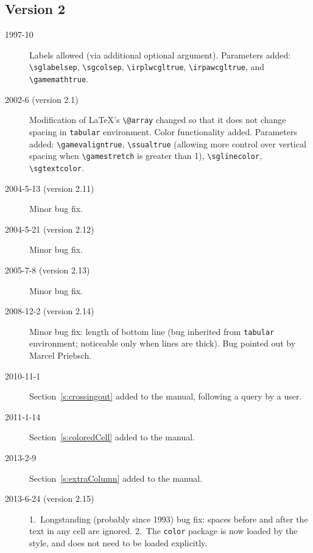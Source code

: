 \documentclass[12pt]{article}
\begin{document}
{\subsection*{Version 2}
\begin{description}
\item[1997-10] Labels allowed (via additional optional argument).  Parameters
added: \verb+\sglabelsep+, \verb+\sgcolsep+, \verb+\irplwcgltrue+,
\verb+\irpawcgltrue+, and \verb+\gamemathtrue+.
\item[2002-6 (version 2.1)] Modification of \LaTeX's \verb+\@array+ changed so
that it does not change spacing in \verb+tabular+ environment.  Color
functionality added.  Parameters added: \verb+\gamevaligntrue+,
\verb+\ssualtrue+ (allowing more control over vertical spacing when
\verb+\gamestretch+ is greater than 1), \verb+\sglinecolor+,
\verb+\sgtextcolor+.
\item[2004-5-13 (version 2.11)] Minor bug fix.
\item[2004-5-21 (version 2.12)] Minor bug fix.
\item[2005-7-8 (version 2.13)] Minor bug fix.
\item[2008-12-2 (version 2.14)] Minor bug fix: length of bottom line (bug
inherited from \verb+tabular+ environment; noticeable only when lines are
thick).  Bug pointed out by Marcel Priebsch.
\item[2010-11-1] Section~\ref{s:crossingout} added to the manual, following a
query by a user.
\item[2011-1-14] Section~\ref{s:coloredCell} added to the manual.
\item[2013-2-9] Section~\ref{s:extraColumn} added to the manual.
\item[2013-6-24 (version 2.15)] 1.\ Longstanding (probably since 1993) bug fix: spaces before and after the text in any cell are ignored.
 2.\ The \texttt{color} package is now loaded by the style, and does not need to be loaded explicitly. \end{description}

}
\end{document}
